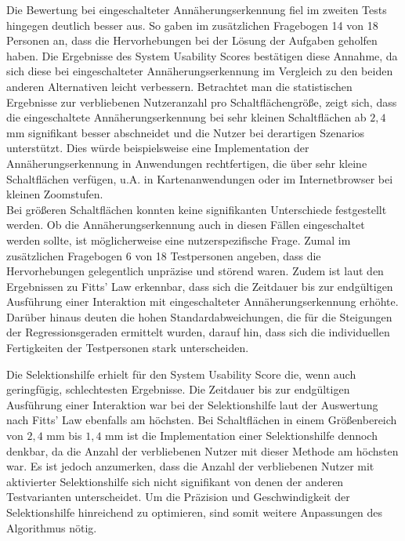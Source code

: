 \documentclass[12pt,numbers=noenddot,parskip,bibliography=totocnumbered,listof=totocnumbered]{scrreprt}
\begin{document}
Die Bewertung bei eingeschalteter Annäherungserkennung fiel im zweiten Tests hingegen deutlich besser aus. So gaben im zusätzlichen Fragebogen 14 von 18 Personen an, dass die Hervorhebungen bei der Lösung der Aufgaben geholfen haben. Die Ergebnisse des System Usability Scores bestätigen diese Annahme, da sich diese bei eingeschalteter Annäherungserkennung im Vergleich zu den beiden anderen Alternativen leicht verbessern. Betrachtet man die statistischen Ergebnisse zur verbliebenen Nutzeranzahl pro Schaltflächengröße, zeigt sich, dass die eingeschaltete Annäherungserkennung bei sehr kleinen Schaltflächen ab $2{,}4$ mm signifikant besser abschneidet und die Nutzer bei derartigen Szenarios unterstützt. Dies würde beispielsweise eine Implementation der Annäherungserkennung in Anwendungen rechtfertigen, die über sehr kleine Schaltflächen verfügen, u.A. in Kartenanwendungen oder im Internetbrowser bei kleinen Zoomstufen.\\
Bei größeren Schaltflächen konnten keine signifikanten Unterschiede festgestellt werden. Ob die Annäherungserkennung auch in diesen Fällen eingeschaltet werden sollte, ist möglicherweise eine nutzerspezifische Frage. Zumal im zusätzlichen Fragebogen 6 von 18 Testpersonen angeben, dass die Hervorhebungen gelegentlich unpräzise und störend waren. Zudem ist laut den Ergebnissen zu Fitts' Law erkennbar, dass sich die Zeitdauer bis zur endgültigen Ausführung einer Interaktion mit eingeschalteter Annäherungserkennung erhöhte. Darüber hinaus deuten die hohen Standardabweichungen, die für die Steigungen der Regressionsgeraden ermittelt wurden, darauf hin, dass sich die individuellen Fertigkeiten der Testpersonen stark unterscheiden.

Die Selektionshilfe erhielt für den System Usability Score die, wenn auch geringfügig, schlechtesten Ergebnisse. Die Zeitdauer bis zur endgültigen Ausführung einer Interaktion war bei der Selektionshilfe laut der Auswertung nach Fitts' Law ebenfalls am höchsten. Bei Schaltflächen in einem Größenbereich von $2{,}4$ mm bis $1{,}4$ mm ist die Implementation einer Selektionshilfe dennoch denkbar, da die Anzahl der verbliebenen Nutzer mit dieser Methode am höchsten war. Es ist jedoch anzumerken, dass die Anzahl der verbliebenen Nutzer mit aktivierter Selektionshilfe sich nicht signifikant von denen der anderen Testvarianten unterscheidet. Um die Präzision und Geschwindigkeit der Selektionshilfe hinreichend zu optimieren, sind somit weitere Anpassungen des Algorithmus nötig.
\end{document}
